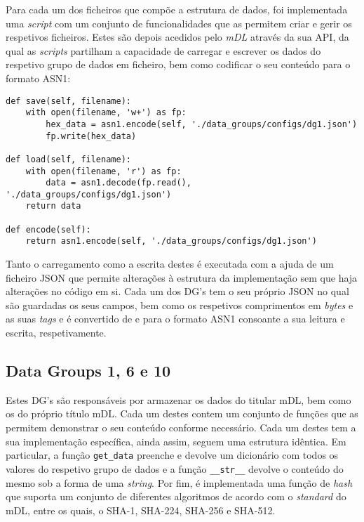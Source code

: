 
Para cada um dos ficheiros que compõe a estrutura de dados, foi implementada uma \textit{script} com um conjunto de funcionalidades que as permitem criar e gerir os respetivos ficheiros. Estes são depois acedidos pelo \textit{mDL} através da sua API, da qual as \textit{scripts} partilham a capacidade de carregar e escrever os dados do respetivo grupo de dados em ficheiro, bem como codificar o seu conteúdo	para o formato ASN1:

\begin{Verbatim}[frame=single, framerule=0.5mm]
def save(self, filename):
    with open(filename, 'w+') as fp:
        hex_data = asn1.encode(self, './data_groups/configs/dg1.json')
        fp.write(hex_data)

def load(self, filename):
    with open(filename, 'r') as fp:
        data = asn1.decode(fp.read(), './data_groups/configs/dg1.json')
    return data

def encode(self):
    return asn1.encode(self, './data_groups/configs/dg1.json')
\end{Verbatim}

Tanto o carregamento como a escrita destes é executada com a ajuda de um ficheiro JSON que permite alterações à estrutura da implementação sem que haja alterações no código em si. Cada um dos DG's tem o seu próprio JSON no qual são guardadas os seus campos, bem como os respetivos comprimentos em \textit{bytes} e as suas \textit{tags} e é convertido de e para o formato ASN1 consoante a sua leitura e escrita, respetivamente.

\subsection{Data Groups 1, 6 e 10}

Estes DG's são responsáveis por armazenar os dados do titular mDL, bem como os do próprio título mDL. Cada um destes contem um conjunto de funções que as permitem demonstrar o seu conteúdo conforme necessário. Cada um destes tem a sua implementação específica, ainda assim, seguem uma estrutura idêntica. Em particular, a função \texttt{get\_data} preenche e devolve um dicionário com todos os valores do respetivo grupo de dados e a função \texttt{\_\_str\_\_} devolve o conteúdo do mesmo sob a forma de uma \textit{string}. Por fim, é implementada uma função de \textit{hash} que suporta um conjunto de diferentes algoritmos de acordo com o \textit{standard} do mDL, entre os quais, o SHA-1, SHA-224, SHA-256 e SHA-512.


